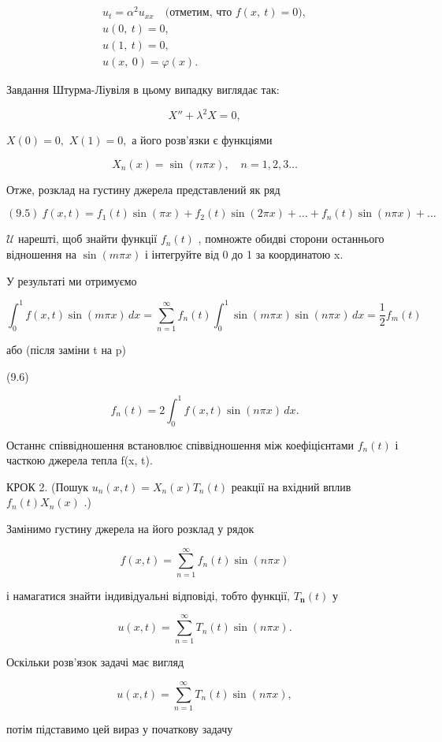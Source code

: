 \documentclass[
  ukrainian,
]{article}
\begin{document}
\[
\begin{array}{c} u_t = \alpha^2 u_{xx} \quad \text{(отметим, что } f(x, \ t) = 0), \\ u(0, \ t) = 0, \\ u(1, \ t) = 0, \\ u(x, \ 0) = \varphi(x). \end{array}
\]

Завдання Штурма-Ліувіля в цьому випадку виглядає так:

\[
X'' + \lambda^2 X = 0,
\]

\(X(0) = 0,\) \(X(1) = 0,\) а його розв'язки є функціями

\[
X_n(x) = \sin(n\pi x), \quad n = 1, 2, 3 \dots
\]

Отже, розклад на густину джерела представлений як ряд

\[
(9.5) \ f(x,t) = f_1(t) \sin(\pi x) + f_2(t) \sin(2\pi x) + \dots + f_n(t) \sin(n\pi x) + \dots
\]

\(\mathcal{U}\) нарешті, щоб знайти функції \(f_n(t)\) , помножте обидві
сторони останнього відношення на \(\sin(m\pi x)\) і інтегруйте від 0 до
1 за координатою x.

У результаті ми отримуємо

\[
\int_{0}^{1} f(x, t) \sin(m\pi x)\,dx = \sum_{n=1}^{\infty} f_{n}(t) \int_{0}^{1} \sin(m\pi x) \sin(n\pi x)\,dx = \frac{1}{2} f_{m}(t)
\]

або (після заміни t на p)

(9.6)

\[
f_{n}(t) = 2 \int_{0}^{1} f(x, t) \sin(n\pi x)\,dx.
\]

Останнє співвідношення встановлює співвідношення між коефіцієнтами
\(f_n(t)\) і часткою джерела тепла f(x, t).

КРОК 2. (Пошук \(u_n(x, t) = X_n(x) T_n(t)\) реакції на вхідний вплив
\(f_n(t) X_n(x)\) .)

Замінимо густину джерела на його розклад у рядок

\[f(x, t) = \sum_{n=1}^{\infty} f_n(t) \sin(n\pi x)\]

і намагатися знайти індивідуальні відповіді, тобто функції,
\(T_{\mathbf{n}}(t)\) у

\[u(x, t) = \sum_{n=1}^{\infty} T_n(t) \sin(n\pi x).\]

Оскільки розв'язок задачі має вигляд

\[u(x, t) = \sum_{n=1}^{\infty} T_n(t) \sin(n\pi x),\]

потім підставимо цей вираз у початкову задачу
\end{document}
